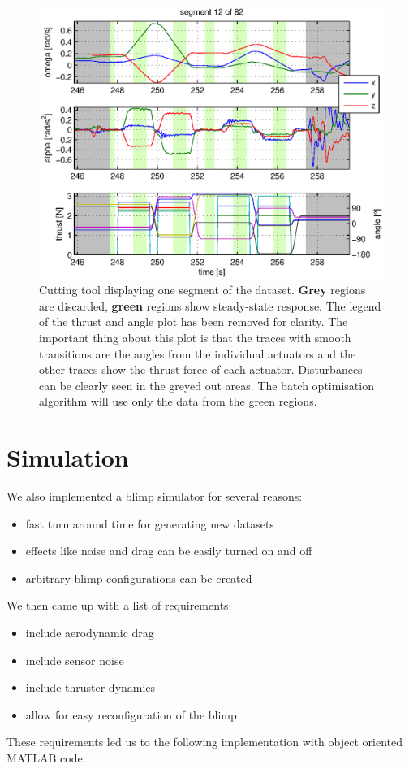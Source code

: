 \begin{figure}[htbp]
\centering
\includegraphics[scale=0.8]{images/interactive_cut/interactive_cut_detail_modified.eps}
\caption{Cutting tool displaying one segment of the dataset. 
\textbf{Grey} regions are discarded, \textbf{green} regions show steady-state response.
The legend of the thrust and angle plot has been removed for clarity. The important thing about this plot is that the traces with smooth transitions are the angles from the individual actuators and the other traces show the thrust force of each actuator.
Disturbances can be clearly seen in the greyed out areas.
The batch optimisation algorithm will use only the data from the green regions.}
\end{figure}

\section{Simulation}
\label{sec:simulation}
We also implemented a blimp simulator for several reasons:
\begin{itemize}
\item fast turn around time for generating new datasets
\item effects like noise and drag can be easily turned on and off
\item arbitrary blimp configurations can be created
\end{itemize}
We then came up with a list of requirements:
\begin{itemize}
\item include aerodynamic drag
\item include sensor noise
\item include thruster dynamics
\item allow for easy reconfiguration of the blimp
\end{itemize}
These requirements led us to the following implementation with object oriented \textsc{MATLAB} code:\\

